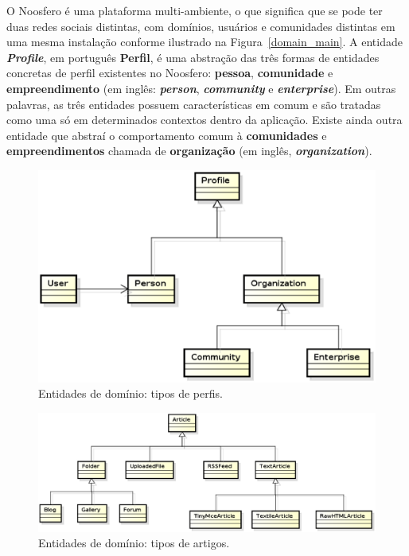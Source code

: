 O Noosfero é uma plataforma multi-ambiente, o que significa que se pode ter duas
redes sociais distintas, com domínios, usuários e comunidades distintas em uma
mesma instalação conforme ilustrado na Figura~\ref{domain_main}.
%
A entidade \textbf{\textit{Profile}}, em português \textbf{Perfil}, é uma
abstração das três formas de entidades concretas de perfil existentes no
Noosfero: \textbf{pessoa}, \textbf{comunidade} e \textbf{empreendimento}
(em inglês: \textbf{\textit{person}}, \textbf{\textit{community}} e
\textbf{\textit{enterprise}}).
%
Em outras palavras, as três entidades possuem características em comum e são tratadas
como uma só em determinados contextos dentro da aplicação. Existe ainda
outra entidade que abstraí o comportamento comum à \textbf{comunidades}
e \textbf{empreendimentos} chamada de \textbf{organização} (em inglês,
\textbf{\textit{organization}}).

\begin{figure}[h!]
    \centering
    \includegraphics[keepaspectratio=true,scale=0.6]
      {figuras/domain_profiles.eps}
    \caption{Entidades de domínio: tipos de perfis.}
    \label{domain_profiles}
\end{figure}

\begin{figure}[h!]
    \centering
    \includegraphics[keepaspectratio=true,scale=0.55]
      {figuras/domain_articles.eps}
    \caption{Entidades de domínio: tipos de artigos.}
    \label{domain_articles}
\end{figure}

